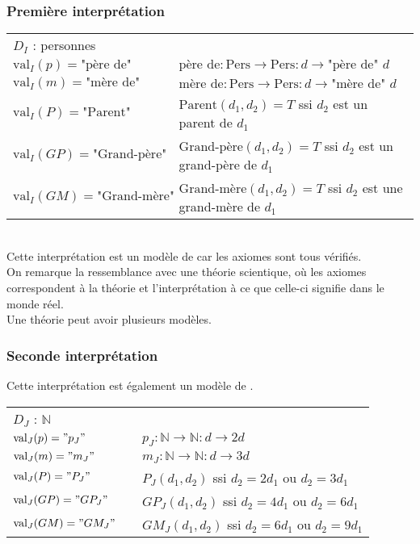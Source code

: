 \subsubsection{Première interprétation}
\begin{tabular}{lll}
$D_I$ : personnes&&\\
$\text{val}_I(p)=\text{"père de"}$ &\hspace*{1cm} &$\text{père de} : \text{Pers}\rightarrow\text{Pers} : d \rightarrow \text{"père de" }d$\\
$\text{val}_I(m)=\text{"mère de"}$ &\hspace*{1cm} &$\text{mère de} : \text{Pers}\rightarrow\text{Pers} : d \rightarrow \text{"mère de" }d$\\
$\text{val}_I(P)=\text{"Parent"}$ &\hspace*{1cm} &$\text{Parent}(d_1,d_2)=T$ ssi $d_2$ est un parent de $d_1$\\
$\text{val}_I(GP)=\text{"Grand-père"}$ &\hspace*{1cm} &$\text{Grand-père}(d_1,d_2)=T$ ssi $d_2$ est un grand-père de $d_1$\\
$\text{val}_I(GM)=\text{"Grand-mère"}$ &\hspace*{1cm} &$\text{Grand-mère}(d_1,d_2)=T$ ssi $d_2$ est une grand-mère de $d_1$\\
\end{tabular}\\

Cette interprétation est un modèle de  car les axiomes sont tous vérifiés.\\
On remarque la ressemblance avec une théorie scientique, où les axiomes correspondent à la théorie et l'interprétation à ce que celle-ci signifie dans le monde réel.\\
Une théorie peut avoir plusieurs modèles.\\ 
\subsubsection{Seconde interprétation}
Cette interprétation est également un modèle de .\\

\begin{tabular}{lll}
$D_J$ : $\mathbb{N}$&&\\
$\text{val}_J(p)="p_J"$ &\hspace*{1cm} &$p_J : \mathbb{N}\rightarrow\mathbb{N} : d \rightarrow 2d$\\
$\text{val}_J(m)="m_J"$ &\hspace*{1cm} &$m_J : \mathbb{N}\rightarrow\mathbb{N} : d \rightarrow 3d$\\
$\text{val}_J(P)="P_J"$ &\hspace*{1cm} &$P_J(d_1,d_2)$ ssi $d_2=2d_1$ ou $d_2=3d_1$\\
$\text{val}_J(GP)="GP_J"$ &\hspace*{1cm} &$GP_J(d_1,d_2)$ ssi $d_2=4d_1$ ou $d_2=6d_1$\\
$\text{val}_J(GM)="GM_J"$ &\hspace*{1cm} &$GM_J(d_1,d_2)$ ssi $d_2=6d_1$ ou $d_2=9d_1$\\
\end{tabular}\\

